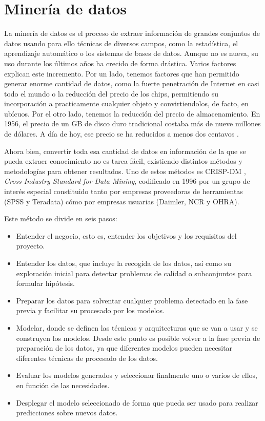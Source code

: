 
\section{Minería de datos}
La minería de datos es el proceso de extraer información de grandes conjuntos de datos usando para ello técnicas de diversos campos, como la estadística, el aprendizaje automático o los sistemas de bases de datos. Aunque no es nueva, su uso durante los últimos años ha crecido de forma drástica. Varios factores explican este incremento. Por un lado, tenemos factores que han permitido generar enorme cantidad de datos, como la fuerte penetración de Internet en casi todo el mundo o la reducción del precio de los chips, permitiendo su incorporación a practicamente cualquier objeto y convirtiendolos, de facto, en ubícuos. Por el otro lado, tenemos la reducción del precio de almacenamiento. En 1956, el precio de un GB de disco duro tradicional costaba más de nueve millones de dólares. A día de hoy, ese precio se ha reducidos a menos dos centavos \cite{Evolucion-precio-gb}. 

Ahora bien, convertir toda esa cantidad de datos en información de la que se pueda extraer conocimiento no es tarea fácil, existiendo distintos métodos y metodologías para obtener resultados. Uno de estos métodos es CRISP-DM \cite{CRISP-DM}, \textit{Cross Industry Standard for Data Mining}, codificado en 1996 por un grupo de interés especial constituido tanto por empresas proveedoras de herramientas (SPSS y Teradata) cómo por empresas usuarias (Daimler, NCR y OHRA).

Este método se divide en seis pasos:
\begin{itemize}
	\item Entender el negocio, esto es, entender los objetivos y los requisitos del proyecto.
	\item Entender los datos, que incluye la recogida de los datos, así como su exploración inicial para detectar problemas de calidad o subconjuntos para formular hipótesis.
	\item Preparar los datos para solventar cualquier problema detectado en la fase previa y facilitar su procesado por los modelos.
	\item Modelar, donde se definen las técnicas y arquitecturas que se van a usar y se construyen los modelos. Desde este punto es posible volver a la fase previa de preparación de los datos, ya que diferentes modelos pueden necesitar diferentes técnicas de procesado de los datos.
	\item Evaluar los modelos generados y seleccionar finalmente uno o varios de ellos, en función de las necesidades.
	\item Desplegar el modelo seleccionado de forma que pueda ser usado para realizar predicciones sobre nuevos datos.
\end{itemize}

